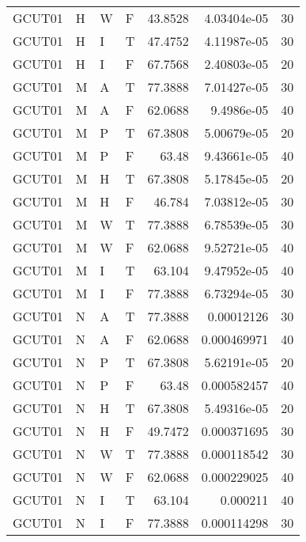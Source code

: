 \begin{table}[!htb]
{\begin{tabular}{llllrrr}
            GCUT01   & H     & W     & F          & 43.8528    & 4.03404e-05 & 30       \\
            GCUT01   & H     & I     & T          & 47.4752    & 4.11987e-05 & 30       \\
            GCUT01   & H     & I     & F          & 67.7568    & 2.40803e-05 & 20       \\
            GCUT01   & M     & A     & T          & 77.3888    & 7.01427e-05 & 30       \\
            GCUT01   & M     & A     & F          & 62.0688    & 9.4986e-05  & 40       \\
            GCUT01   & M     & P     & T          & 67.3808    & 5.00679e-05 & 20       \\
            GCUT01   & M     & P     & F          & 63.48      & 9.43661e-05 & 40       \\
            GCUT01   & M     & H     & T          & 67.3808    & 5.17845e-05 & 20       \\
            GCUT01   & M     & H     & F          & 46.784     & 7.03812e-05 & 30       \\
            GCUT01   & M     & W     & T          & 77.3888    & 6.78539e-05 & 30       \\
            GCUT01   & M     & W     & F          & 62.0688    & 9.52721e-05 & 40       \\
            GCUT01   & M     & I     & T          & 63.104     & 9.47952e-05 & 40       \\
            GCUT01   & M     & I     & F          & 77.3888    & 6.73294e-05 & 30       \\
            GCUT01   & N     & A     & T          & 77.3888    & 0.00012126  & 30       \\
            GCUT01   & N     & A     & F          & 62.0688    & 0.000469971 & 40       \\
            GCUT01   & N     & P     & T          & 67.3808    & 5.62191e-05 & 20       \\
            GCUT01   & N     & P     & F          & 63.48      & 0.000582457 & 40       \\
            GCUT01   & N     & H     & T          & 67.3808    & 5.49316e-05 & 20       \\
            GCUT01   & N     & H     & F          & 49.7472    & 0.000371695 & 30       \\
            GCUT01   & N     & W     & T          & 77.3888    & 0.000118542 & 30       \\
            GCUT01   & N     & W     & F          & 62.0688    & 0.000229025 & 40       \\
            GCUT01   & N     & I     & T          & 63.104     & 0.000211    & 40       \\
            GCUT01   & N     & I     & F          & 77.3888    & 0.000114298 & 30       \\
            \hline
        \end{tabular}
    }{}
\end{table}